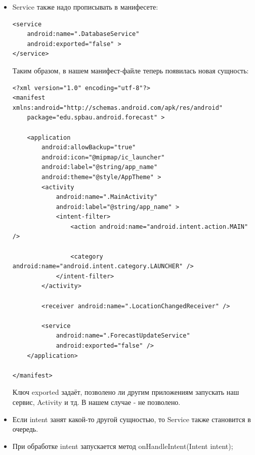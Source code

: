 \documentclass[12 pt]{article}
\begin{document}
    \begin{itemize}
        \item Service также надо прописывать в манифесете:
        \begin{lstlisting}
<service
    android:name=".DatabaseService"
    android:exported="false" >
</service>        
        \end{lstlisting}
        
        Таким образом, в нашем манифест-файле теперь появилась новая сущность:
        \begin{lstlisting}
<?xml version="1.0" encoding="utf-8"?>
<manifest xmlns:android="http://schemas.android.com/apk/res/android"
    package="edu.spbau.android.forecast" >

    <application
        android:allowBackup="true"
        android:icon="@mipmap/ic_launcher"
        android:label="@string/app_name"
        android:theme="@style/AppTheme" >
        <activity
            android:name=".MainActivity"
            android:label="@string/app_name" >
            <intent-filter>
                <action android:name="android.intent.action.MAIN" />

                <category android:name="android.intent.category.LAUNCHER" />
            </intent-filter>
        </activity>

        <receiver android:name=".LocationChangedReceiver" />

        <service
            android:name=".ForecastUpdateService"
            android:exported="false" />
    </application>

</manifest>        
        \end{lstlisting}
        Ключ exported задаёт, позволено ли другим приложениям запускать наш сервис, Activity и тд. В нашем случае - не позволено.
        \item Если intent занят какой-то другой сущностью, то Service также становится в очередь.
        \item При обработке intent запускается метод onHandleIntent(Intent intent);
    \end{itemize}
    
\end{document}
